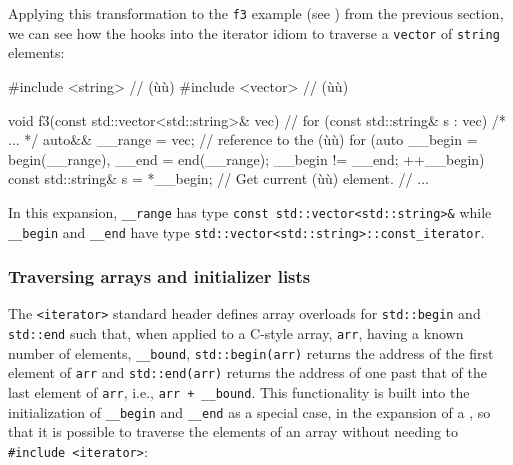 {{Applying this transformation to the \lstinline!f3! example (see \pageref{iterating-over-std::vector-with-a-range-based-for-loop}) from the previous section, we can see how the
 hooks into the iterator idiom to
traverse a \lstinline!vector! of \lstinline!string! elements:

\begin{emcppslisting}
#include <string>  // (ù{}ù)
#include <vector>  // (ù{}ù)

void f3(const std::vector<std::string>& vec)
{
    // for (const std::string& s : vec) { /* ... */ }
    {
        auto&& __range = vec;  // reference to the (ù{}ù)
        for (auto __begin = begin(__range), __end = end(__range);
            __begin != __end;
            ++__begin)
        {
            const std::string& s = *__begin;  // Get current (ù{}ù) element.
            {
                // ...
            }
        }
    }
}
\end{emcppslisting}


\noindent In this expansion, \lstinline!__range! has type
\lstinline!const!~\lstinline!std::vector<std::string>&! while
\lstinline!__begin! and \lstinline!__end! have type
\lstinline!std::vector<std::string>::const_iterator!.

\subsubsection[Traversing arrays and initializer lists]{Traversing arrays and initializer lists}\label{traversing-arrays-and-initializer-lists}

The \lstinline!<iterator>! standard header defines array overloads for
\lstinline!std::begin! and \lstinline!std::end! such that, when applied to a
C-style array, \lstinline!arr!, having a known number of elements,
\lstinline!__bound!, \lstinline!std::begin(arr)! returns the address of the
first element of \lstinline!arr! and \lstinline!std::end(arr)! returns the
address of one past that of the last element of \lstinline!arr!, i.e.,
\lstinline!arr!~\lstinline!+!~\lstinline!__bound!. This functionality is built
into the initialization of \lstinline!__begin! and \lstinline!__end! as a
special case, in the expansion of a , so that it is possible to traverse the elements of an array
without needing to \lstinline!#include!~\lstinline!<iterator>!:

}}
